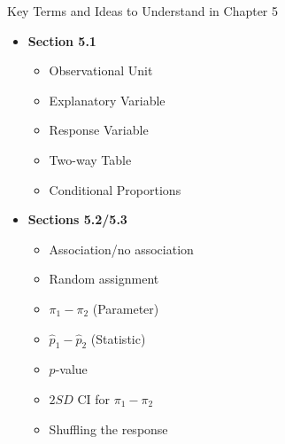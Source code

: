 \documentclass[13pt]{beamer}
\begin{document}
\begin{frame}{Key Terms and Ideas to Understand in Chapter 5}
\begin{multicols}{2}
\begin{itemize}
	\item \textbf{Section 5.1}
\begin{itemize}
   \item Observational Unit
   \item Explanatory Variable
   \item Response Variable
   \item Two-way Table
   \item Conditional Proportions
\end{itemize}
	\vspace*{0.2in}
	\item \textbf{Sections 5.2/5.3}
\begin{itemize}
   \item Association/no association
   \item Random assignment
   \item $\pi_1 - \pi_2$ (Parameter)
   \item $\hat{p}_1 - \hat{p}_2$ (Statistic)
   \item $p$-value
   \item $2SD$ CI for $\pi_1 - \pi_2$
   \item Shuffling the response
\end{itemize}  

\end{itemize}
\end{multicols}
\end{frame}
\end{document}
